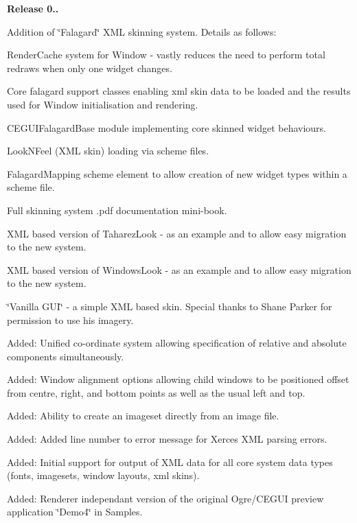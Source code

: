 {\bfseries{Release 0..}}
\begin{DoxyItemize}
\item Addition of \char`\"{}\+Falagard\char`\"{} X\+ML skinning system. Details as follows\+:
\begin{DoxyItemize}
\item Render\+Cache system for Window -\/ vastly reduces the need to perform total redraws when only one widget changes.
\item Core falagard support classes enabling xml skin data to be loaded and the results used for Window initialisation and rendering.
\item C\+E\+G\+U\+I\+Falagard\+Base module implementing core skinned widget behaviours.
\item Look\+N\+Feel (X\+ML skin) loading via scheme files.
\item Falagard\+Mapping scheme element to allow creation of \textquotesingle{}new\textquotesingle{} widget types within a scheme file.
\item Full skinning system .pdf documentation \textquotesingle{}mini-\/book\textquotesingle{}.
\item X\+ML based version of Taharez\+Look -\/ as an example and to allow easy migration to the new system.
\item X\+ML based version of Windows\+Look -\/ as an example and to allow easy migration to the new system.
\item \char`\"{}\+Vanilla G\+U\+I\char`\"{} -\/ a simple X\+ML based skin. Special thanks to Shane Parker for permission to use his imagery.
\end{DoxyItemize}
\item Added\+: \textquotesingle{}Unified\textquotesingle{} co-\/ordinate system allowing specification of relative and absolute components simultaneously.
\item Added\+: Window alignment options allowing child windows to be positioned offset from centre, right, and bottom points as well as the usual left and top.
\item Added\+: Ability to create an imageset directly from an image file.
\item Added\+: Added line number to error message for Xerces X\+ML parsing errors.
\item Added\+: Initial support for output of X\+ML data for all core system data types (fonts, imagesets, window layouts, xml skins).
\item Added\+: Renderer independant version of the original Ogre/\+C\+E\+G\+UI preview application \char`\"{}\+Demo4\char`\"{} in Samples.

\end{DoxyItemize}
